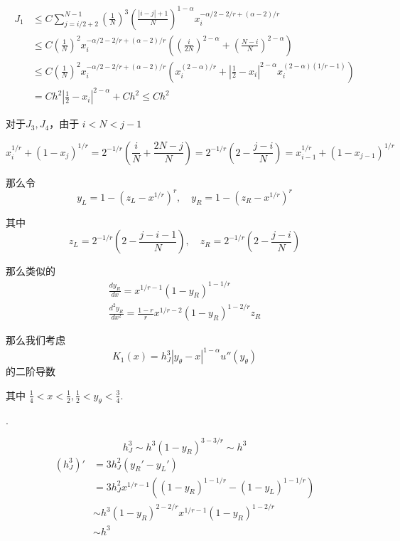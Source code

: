 \documentclass{ctexart}
\theoremstyle{definition}
\theoremstyle{remark}
\numberwithin{equation}{section}
\begin{document}
\begin{equation}
    \begin{aligned}
        J_1 & \le C \sum_{j=i/2+2}^{N-1} \left(\frac{1}{N}\right)^3 \left(\frac{|i-j|+1}{N}\right)^{1-\alpha} x_i^{-\alpha/2-2/r+(\alpha-2)/r}                   \\
            & \le C  \left(\frac{1}{N}\right)^2 x_i^{-\alpha/2-2/r+(\alpha-2)/r} (\left(\frac{i}{2N}\right)^{2-\alpha} + \left(\frac{N-i}{N}\right)^{2-\alpha} ) \\
            & \le C \left(\frac{1}{N}\right)^2 x_i^{-\alpha/2-2/r+(\alpha-2)/r} (x_i^{(2-\alpha)/r} + |\frac{1}{2}-x_i|^{2-\alpha} x_i^{(2-\alpha)(1/r-1)} )     \\
            & = C h^2 |\frac{1}{2}-x_i|^{2-\alpha} + Ch^2 \le C h^2
    \end{aligned}
\end{equation}

对于\(J_3,J_4\)，由于 \(i<N<j-1\)

\begin{equation}
    x_i^{1/r} + (1-x_j)^{1/r} = 2^{-1/r} (\frac{i}{N} + \frac{2N-j}{N}) = 2^{-1/r} (2-\frac{j-i}{N}) = x_{i-1}^{1/r} + (1-x_{j-1})^{1/r}
\end{equation}

那么令
\begin{equation}
    y_L = 1 - (z_L - x^{1/r})^{r}, \quad y_R = 1 - (z_R - x^{1/r})^{r}
\end{equation}

其中
\begin{equation}
    z_L = 2^{-1/r} (2-\frac{j-i-1}{N}), \quad z_R = 2^{-1/r} (2-\frac{j-i}{N})
\end{equation}

那么类似的
\begin{gather}
    \frac{d y_R}{dx} = x^{1/r-1} (1-y_R)^{1-1/r}    \\
    \frac{d^2 y_R}{dx^2} = \frac{1-r}{r} x^{1/r-2} (1-y_R)^{1-2/r}z_R
\end{gather}

那么我们考虑
\begin{equation}
    K_1(x) = h_J^3 |y_\theta-x|^{1-\alpha} u''(y_\theta)
\end{equation}
的二阶导数

其中 \(\frac{1}{4}< x< \frac{1}{2}, \frac{1}{2} < y_\theta <\frac{3}{4}\).

.

\begin{equation}
    h_J^3 \sim h^3 (1-y_R)^{3-3/r} \sim h^3
\end{equation}
\begin{equation}
    \begin{aligned}
        (h_J^3)' & = 3 h_J^2 (y_R' - y_L ')                               \\
                 & = 3 h_J^2 x^{1/r-1}((1-y_R)^{1-1/r} - (1-y_L)^{1-1/r}) \\
                 & \sim h^3 (1-y_R)^{2-2/r} x^{1/r-1} (1-y_R)^{1-2/r}     \\
                 & \sim h^3
    \end{aligned}
\end{equation}
\end{document}
